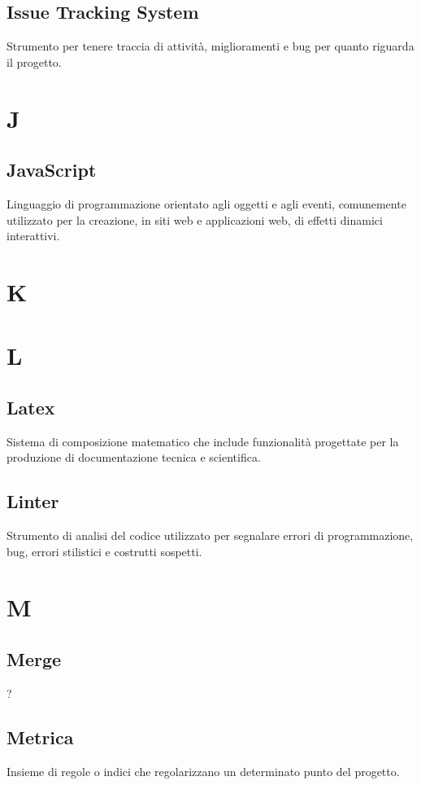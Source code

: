 \subsection*{Issue Tracking System}
Strumento per tenere traccia di attività, miglioramenti e bug per quanto riguarda il progetto.

\section*{J}
\subsection*{JavaScript}
Linguaggio di programmazione orientato agli oggetti e agli eventi, comunemente utilizzato per la creazione, in siti web e applicazioni web, di effetti dinamici interattivi.

\section*{K}


\section*{L}
\subsection*{Latex}
Sistema di composizione matematico che include funzionalità progettate per la produzione di documentazione tecnica e scientifica.

\subsection*{Linter}
Strumento di analisi del codice utilizzato per segnalare errori di programmazione, bug, errori stilistici e costrutti sospetti.

\section*{M}
\subsection*{Merge}
?

\subsection*{Metrica}
Insieme di regole o indici che regolarizzano un determinato punto del progetto.

